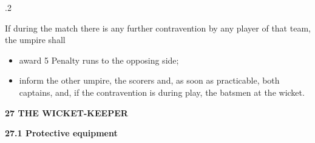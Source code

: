 \documentclass[12pt]{article}
\begin{document}
\vspace{\baselineskip}

\vspace{\baselineskip}

\vspace{\baselineskip}

\vspace{\baselineskip}
\begin{Center}
{\fontsize{8pt}{9.6pt}\par}
\end{Center}\par


\vspace{\baselineskip}
{\fontsize{9pt}{10.8pt}.2 \tabto{0.49in} {\fontsize{8pt}{9.6pt}\selectfont If during the match there is any further contravention by any player of that team, the umpire shall\par}\par}\par


\vspace{\baselineskip}
\begin{itemize}
	\item {\fontsize{9pt}{10.8pt}\selectfont award 5 Penalty runs to the opposing side;\par}\par


\vspace{\baselineskip}
	\item {\fontsize{9pt}{10.8pt}\selectfont inform the other umpire, the scorers and, as soon as practicable, both captains, and, if the contravention is during play, the batsmen at the wicket.\par}
\end{itemize}\par


\vspace{\baselineskip}
{\fontsize{16pt}{19.2pt}\selectfont \textbf{27 THE WICKET-KEEPER}\par}\par


\vspace{\baselineskip}
{\fontsize{11pt}{13.2pt}\selectfont \textbf{27.1 \tabto{0.47in} Protective equipment}\par}\par
\end{document}
